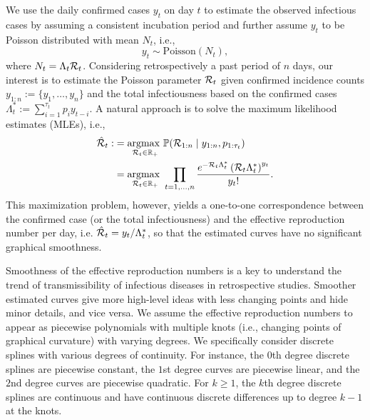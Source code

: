 We use the daily confirmed cases $y_t$ on day $t$ to estimate the observed infectious cases by assuming a consistent incubation period and further assume $y_t$ to be Poisson distributed with mean $N_t$, i.e., 
\begin{equation*} 
  y_t \sim \mathrm{Poisson}(N_t),
\end{equation*}
where $N_t = \Lambda_t \mathcal{R}_t$. Considering retrospectively a past period of $n$ days, our interest is to estimate the Poisson parameter $\mathcal{R}_t$ given confirmed incidence counts ${y}_{1:n} := \{y_1,\dots,y_n\}$ and the total infectiousness based on the confirmed cases $\Lambda^{\ast}_t := \sum_{i=1}^{\tau_t} p_i y_{t-i}$. A natural approach is to solve the maximum likelihood estimates (MLEs), i.e., 
\begin{equation} \label{eq:mle}
  \begin{split}
    \hat{\mathcal{R}}_t :&= \underset{\mathcal{R}_t \in \mathbb{R}_+}{\operatorname*{argmax}\ } \mathbb{P}(\mathcal{R}_{1:n} \mid y_{1:n}, p_{1:\tau_t}) \\
    &= \underset{\mathcal{R}_t \in \mathbb{R}_+}{\operatorname*{argmax}\ } \prod_{t = 1,\dots,n} \frac{e^{- \mathcal{R}_t \Lambda^{\ast}_t} \left(\mathcal{R}_t \Lambda^{\ast}_t\right)^{y_t} }{y_t!}.
  \end{split}
\end{equation}
This maximization problem, however, yields a one-to-one correspondence between the confirmed case (or the total infectiousness) and the effective reproduction number per day, i.e. $\hat{\mathcal{R}}_t = y_t / \Lambda^{\ast}_t$, so that the estimated curves have no significant graphical smoothness. 

Smoothness of the effective reproduction numbers is a key to understand the trend of transmissibility of infectious diseases in retrospective studies. Smoother estimated curves give more high-level ideas with less changing points and hide minor details, and vice versa. 
We assume the effective reproduction numbers to appear as piecewise polynomials with multiple knots (i.e., changing points of graphical curvature) with varying degrees. We specifically consider discrete splines with various degrees of continuity. For instance, the $0$th degree discrete splines are piecewise constant, the $1$st degree curves are piecewise linear, and the $2$nd degree curves are piecewise quadratic. For $k\geq 1$, the $k$th degree discrete splines are continuous and have continuous discrete differences up to degree $k-1$ at the knots. 

